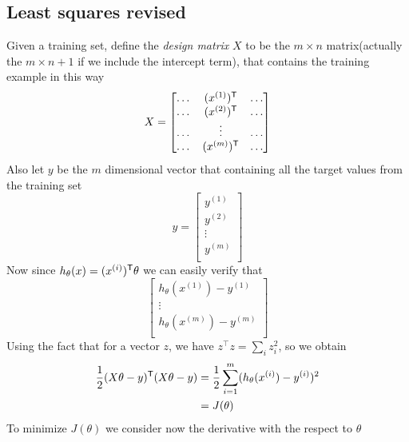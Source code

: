 \subsection{Least squares revised}
Given a training set, define the \emph{design matrix} $X$ to be the $m \times n$ matrix(actually 
the $m \times n+1$ if we include the intercept term), that contains the training example in this way 
\[ X = \begin{bmatrix}
        \dots & (x^{(1)}) ^ \mathsf{T} & \dots \\
        \dots & (x^{(2)}) ^ \mathsf{T} & \dots \\
        \dots & \vdots & \dots \\
        \dots & (x^{(m)}) ^ \mathsf{T} & \dots \\
        \end{bmatrix} \]
Also let $y$ be the $m$ dimensional vector that containing all the target values from the training set
\[ y = \begin{bmatrix}
        y^{(1)} \\
        y^{(2)} \\
        \vdots \\
        y^{(m)} \\
        \end{bmatrix} \]
Now since $h_{\theta}(x) = (x^{(i)}) ^ \mathsf{T} \theta$ we can easily verify that
\[ \begin{bmatrix}
    h_{\theta}(x^{(1)}) - y^{(1)} \\
    \vdots \\
    h_{\theta}(x^{(m)}) - y^{(m)} \\
    \end{bmatrix} \]
Using the fact that for a vector $z$, we have $z ^\intercal z = \sum _i z_i^2$, so we obtain 
\begin{align*}
    \frac{1}{2} (X \theta - y) ^ \mathsf{T} (X \theta - y) & = \frac{1}{2} \sum _{i = 1}^m
                                                            (h_{\theta}(x^{(i)}) - y^{(i)})^2 \\
                                                        & = J(\theta) \\
\end{align*}
To minimize $J(\theta)$ we consider now the derivative with the respect to $\theta$ 
